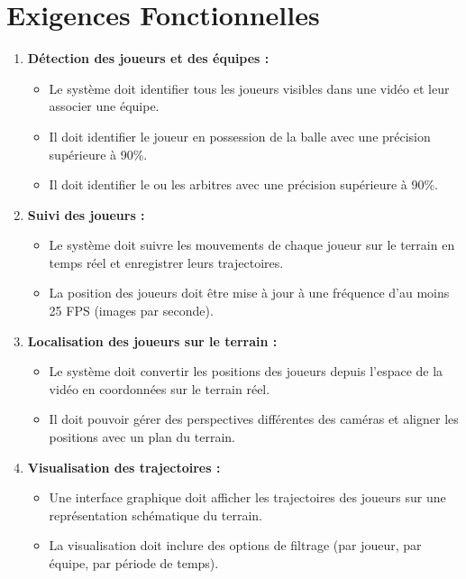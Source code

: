 \section*{Exigences Fonctionnelles}
\begin{enumerate}
    \item \textbf{Détection des joueurs et des équipes :}
    \begin{itemize}
        \item Le système doit identifier tous les joueurs visibles dans une vidéo et leur associer une équipe.
        \item Il doit identifier le joueur en possession de la balle avec une précision supérieure à 90\%.
        \item Il doit identifier le ou les arbitres avec une précision supérieure à 90\%.
    \end{itemize}
    
    \item \textbf{Suivi des joueurs :}
    \begin{itemize}
        \item Le système doit suivre les mouvements de chaque joueur sur le terrain en temps réel et enregistrer leurs trajectoires.
        \item La position des joueurs doit être mise à jour à une fréquence d’au moins 25 FPS (images par seconde).
    \end{itemize}
    
    \item \textbf{Localisation des joueurs sur le terrain :}
    \begin{itemize}
        \item Le système doit convertir les positions des joueurs depuis l’espace de la vidéo en coordonnées sur le terrain réel.
        \item Il doit pouvoir gérer des perspectives différentes des caméras et aligner les positions avec un plan du terrain.
    \end{itemize}
    
    \item \textbf{Visualisation des trajectoires :}
    \begin{itemize}
        \item Une interface graphique doit afficher les trajectoires des joueurs sur une représentation schématique du terrain.
        \item La visualisation doit inclure des options de filtrage (par joueur, par équipe, par période de temps).
    \end{itemize}
    

\end{enumerate}
